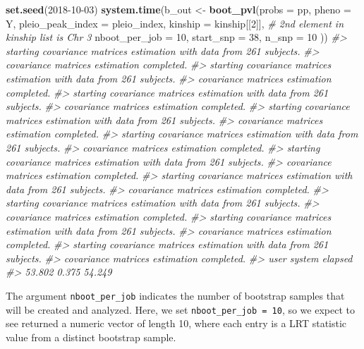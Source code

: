\documentclass[oneside]{book}
\newenvironment{Shaded}{\begin{snugshade}}{\end{snugshade}}
\newcommand{\CommentTok}[1]{\textcolor[rgb]{0.56,0.35,0.01}{\textit{#1}}}
\newcommand{\DataTypeTok}[1]{\textcolor[rgb]{0.13,0.29,0.53}{#1}}
\newcommand{\DecValTok}[1]{\textcolor[rgb]{0.00,0.00,0.81}{#1}}
\newcommand{\KeywordTok}[1]{\textcolor[rgb]{0.13,0.29,0.53}{\textbf{#1}}}
\newcommand{\NormalTok}[1]{#1}
\newcommand{\StringTok}[1]{\textcolor[rgb]{0.31,0.60,0.02}{#1}}
\begin{document}
\begin{Shaded}
\begin{Highlighting}[]
\KeywordTok{set.seed}\NormalTok{(}\DecValTok{2018-10-03}\NormalTok{)}
\KeywordTok{system.time}\NormalTok{(b_out <-}\StringTok{ }\KeywordTok{boot_pvl}\NormalTok{(}\DataTypeTok{probs =}\NormalTok{ pp,}
         \DataTypeTok{pheno =}\NormalTok{ Y, }
         \DataTypeTok{pleio_peak_index =}\NormalTok{ pleio_index, }
         \DataTypeTok{kinship =}\NormalTok{ kinship[[}\DecValTok{2}\NormalTok{]], }\CommentTok{# 2nd element in kinship list is Chr 3 }
         \DataTypeTok{nboot_per_job =} \DecValTok{10}\NormalTok{, }
         \DataTypeTok{start_snp =} \DecValTok{38}\NormalTok{, }
         \DataTypeTok{n_snp =} \DecValTok{10}
\NormalTok{         ))}
\CommentTok{#> starting covariance matrices estimation with data from 261 subjects.}
\CommentTok{#> covariance matrices estimation completed.}
\CommentTok{#> starting covariance matrices estimation with data from 261 subjects.}
\CommentTok{#> covariance matrices estimation completed.}
\CommentTok{#> starting covariance matrices estimation with data from 261 subjects.}
\CommentTok{#> covariance matrices estimation completed.}
\CommentTok{#> starting covariance matrices estimation with data from 261 subjects.}
\CommentTok{#> covariance matrices estimation completed.}
\CommentTok{#> starting covariance matrices estimation with data from 261 subjects.}
\CommentTok{#> covariance matrices estimation completed.}
\CommentTok{#> starting covariance matrices estimation with data from 261 subjects.}
\CommentTok{#> covariance matrices estimation completed.}
\CommentTok{#> starting covariance matrices estimation with data from 261 subjects.}
\CommentTok{#> covariance matrices estimation completed.}
\CommentTok{#> starting covariance matrices estimation with data from 261 subjects.}
\CommentTok{#> covariance matrices estimation completed.}
\CommentTok{#> starting covariance matrices estimation with data from 261 subjects.}
\CommentTok{#> covariance matrices estimation completed.}
\CommentTok{#> starting covariance matrices estimation with data from 261 subjects.}
\CommentTok{#> covariance matrices estimation completed.}
\CommentTok{#>    user  system elapsed }
\CommentTok{#>  53.802   0.375  54.249}
\end{Highlighting}
\end{Shaded}

The argument \texttt{nboot\_per\_job} indicates the number of bootstrap
samples that will be created and analyzed. Here, we set
\texttt{nboot\_per\_job\ =\ 10}, so we expect to see returned a numeric
vector of length 10, where each entry is a LRT statistic value from a
distinct bootstrap sample.
\end{document}
